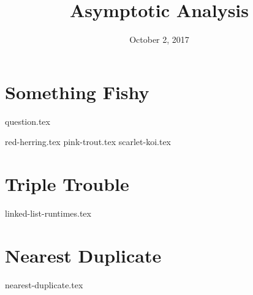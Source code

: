 \documentclass[11pt]{exam}
\title{Asymptotic Analysis}
\date{October 2, 2017}
\begin{document}
\maketitle

\section{Something Fishy}
{question.tex}
\begin{questions}
{red-herring.tex}
{pink-trout.tex}
{scarlet-koi.tex}
\end{questions}

\clearpage

\section{Triple Trouble}
\begin{questions}
{linked-list-runtimes.tex}
\end{questions}

\clearpage

\section{Nearest Duplicate}
\begin{questions}
{nearest-duplicate.tex}
\end{questions}
\end{document}
